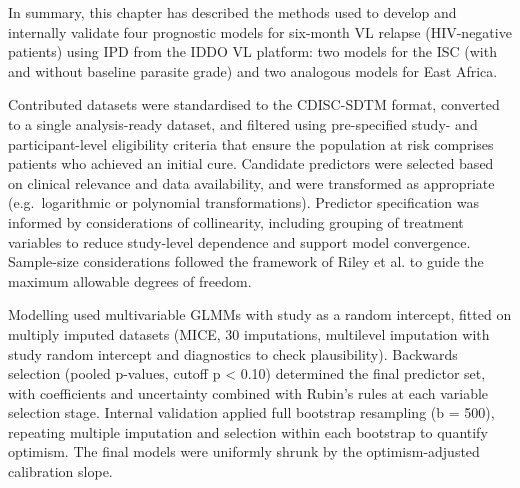 In summary, this chapter has described the methods used to develop and internally validate four prognostic models for six-month VL relapse (HIV-negative patients) using IPD from the IDDO VL platform: two models for the ISC (with and without baseline parasite grade) and two analogous models for East Africa.

Contributed datasets were standardised to the CDISC-SDTM format, converted to a single analysis-ready dataset, and filtered using pre-specified study- and participant-level eligibility criteria that ensure the population at risk comprises patients who achieved an initial cure. Candidate predictors were selected based on clinical relevance and data availability, and were transformed as appropriate (e.g.\ logarithmic or polynomial transformations). Predictor specification was informed by considerations of collinearity, including grouping of treatment variables to reduce study-level dependence and support model convergence. Sample-size considerations followed the framework of Riley et al. to guide the maximum allowable degrees of freedom.

Modelling used multivariable GLMMs with study as a random intercept, fitted on multiply imputed datasets (MICE, 30 imputations, multilevel imputation with study random intercept and diagnostics to check plausibility). Backwards selection (pooled p-values, cutoff p < 0.10) determined the final predictor set, with coefficients and uncertainty combined with Rubin's rules at each variable selection stage. Internal validation applied full bootstrap resampling (b = 500), repeating multiple imputation and selection within each bootstrap to quantify optimism. The final models were uniformly shrunk by the optimism-adjusted calibration slope.
